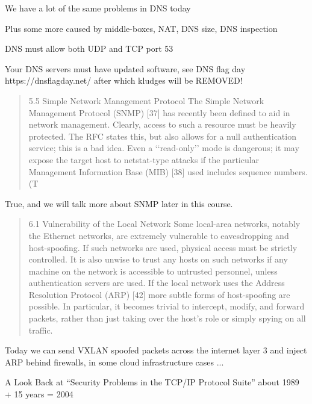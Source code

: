 \documentclass[Screen16to9,17pt]{foils}
\begin{document}
\begin{list1}
\item We have a lot of the same problems in DNS today
\item Plus some more caused by middle-boxes, NAT, DNS size, DNS inspection
\begin{list2}
\item DNS must allow both UDP and TCP port 53
\item Your DNS servers must have updated software, see DNS flag day\\ https://dnsflagday.net/ after which kludges will be REMOVED!
\end{list2}
\end{list1}


\begin{quote}
5.5 Simple Network Management Protocol
The Simple Network Management Protocol (SNMP) [37] has recently been defined to aid in network
management. Clearly, access to such a resource must be heavily protected. The RFC states this, but
also allows for a null authentication service; this is a bad idea. Even a ‘‘read-only’’ mode is dangerous;
it may expose the target host to netstat-type attacks if the particular Management Information Base
(MIB) [38] used includes sequence numbers. (T
\end{quote}

True, and we will talk more about SNMP later in this course.


\begin{quote}
6.1 Vulnerability of the Local Network
Some local-area networks, notably the Ethernet networks, are extremely vulnerable to eavesdropping and
host-spoofing. If such networks are used, physical access must be strictly controlled. It is also unwise
to trust any hosts on such networks if any machine on the network is accessible to untrusted personnel,
unless authentication servers are used.
If the local network uses the Address Resolution Protocol (ARP) [42] more subtle forms of host-spoofing
are possible. In particular, it becomes trivial to intercept, modify, and forward packets, rather than just
taking over the host’s role or simply spying on all traffic.
\end{quote}

Today we can send VXLAN spoofed packets across the internet layer 3 and inject ARP behind firewalls, in some cloud infrastructure cases ...

A Look Back at “Security Problems in the TCP/IP Protocol Suite”
about 1989 + 15 years = 2004

\slidenext
\end{document}
